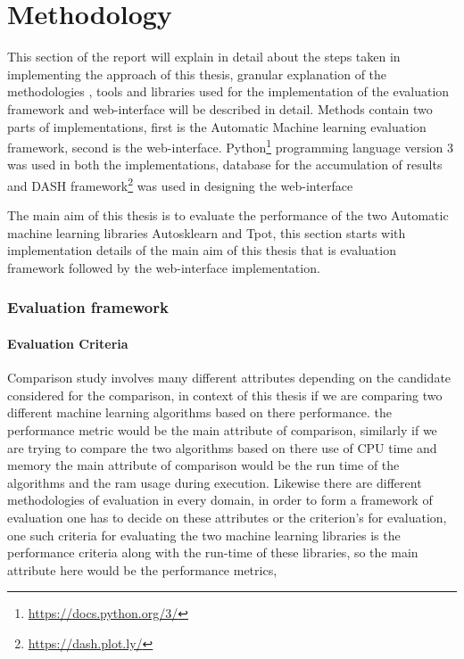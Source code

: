 \chapter{Methodology}\label{chap:methods}

This section of the report will explain in detail about the steps taken in implementing the approach of this thesis, granular explanation of the methodologies , tools and libraries used for the implementation of the evaluation framework and web-interface will be described in detail. Methods contain two parts of  implementations, first is the Automatic Machine learning evaluation framework, second is the web-interface. Python\footnote{\url{https://docs.python.org/3/}} programming language version 3 was used in  both the implementations, database for the accumulation of results and DASH framework\footnote{\url{https://dash.plot.ly/}} was used in designing the web-interface

The main aim of this thesis is to evaluate the performance of the two Automatic machine learning libraries Autosklearn and Tpot, this section starts with implementation details of the main aim of this thesis that is evaluation framework followed by the web-interface implementation.

\subsection{Evaluation framework}

\subsubsection{Evaluation Criteria}
Comparison study involves many different attributes depending on the candidate considered for the comparison, in context of this thesis if we are comparing two different machine learning algorithms based on there performance. the performance metric would be the main attribute of comparison, similarly if we are trying to compare the two algorithms based on there use of CPU time and memory the main attribute of comparison would be the run time of the algorithms and the ram usage during execution. Likewise there are different methodologies of evaluation in every domain, in order to form a framework of evaluation one has to decide on these attributes or the criterion's for evaluation, one such criteria for evaluating the two machine learning libraries is the performance criteria along with the run-time of these libraries, so the main attribute here would be the performance metrics, 

